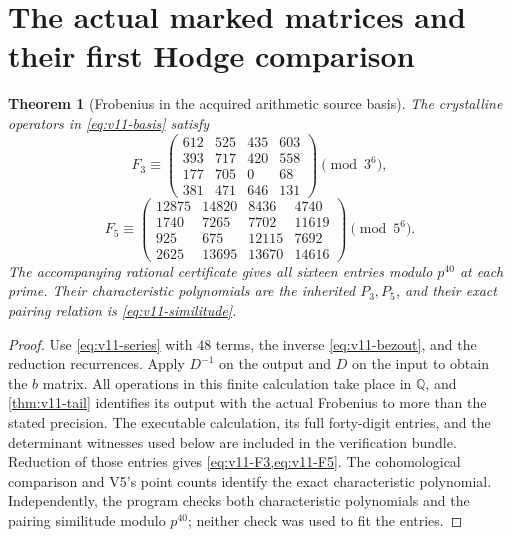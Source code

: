 \documentclass[11pt]{article}
\newtheorem{theorem}{Theorem}[section]
\theoremstyle{definition}
\theoremstyle{remark}
\newcommand{\Q}{\mathbb Q}
\begin{document}
\section{The actual marked matrices and their first Hodge comparison}
\label{sec:v11-matrices}

\begin{theorem}[Frobenius in the acquired arithmetic source basis]
\label{thm:v11-matrices}
The crystalline operators in \cref{eq:v11-basis} satisfy
\begin{equation}
 \boxed{F_3\equiv
 \begin{pmatrix}
 612&525&435&603\\393&717&420&558\\
 177&705&0&68\\381&471&646&131
 \end{pmatrix}\pmod{3^6},}
 \label{eq:v11-F3}
\end{equation}
\begin{equation}
 \boxed{F_5\equiv
 \begin{pmatrix}
 12875&14820&8436&4740\\1740&7265&7702&11619\\
 925&675&12115&7692\\2625&13695&13670&14616
 \end{pmatrix}\pmod{5^6}.}
 \label{eq:v11-F5}
\end{equation}
The accompanying rational certificate gives all sixteen entries modulo
$p^{40}$ at each prime. Their characteristic polynomials are the
inherited $P_3,P_5$, and their exact pairing relation is
\cref{eq:v11-similitude}.
\end{theorem}
\begin{proof}
Use \cref{eq:v11-series} with $48$ terms, the inverse
\cref{eq:v11-bezout}, and the reduction recurrences. Apply $D^{-1}$
on the output and $D$ on the input to obtain the $b$ matrix. All
operations in this finite calculation take place in $\Q$, and
\cref{thm:v11-tail} identifies its output with the actual Frobenius
to more than the stated precision. The executable calculation, its
full forty-digit entries, and the determinant witnesses used below are
included in the verification bundle. Reduction of those entries gives
\cref{eq:v11-F3,eq:v11-F5}. The cohomological comparison and V5's
point counts identify the exact characteristic polynomial. Independently,
the program checks both characteristic polynomials and the pairing
similitude modulo $p^{40}$; neither check was used to fit the entries.
\end{proof}
\end{document}
